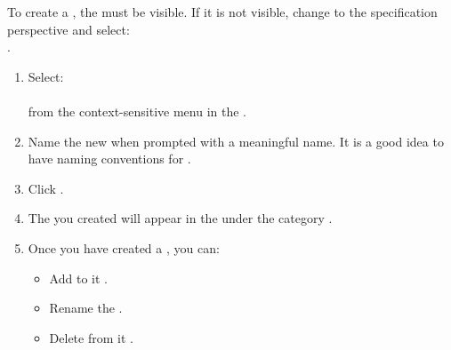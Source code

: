 To create a \gdjob{}, the \gdtestsuitebrowser{} must be visible.
 If it is not visible, change to the specification perspective and select:\\
.

\begin{enumerate}
\item Select:\\
\\
from the context-sensitive menu in the \gdtestsuitebrowser{}. 

\item Name  the new \gdjob{} when prompted with a meaningful name. It is a good idea to have naming conventions for \gdjobs{}. 
\item Click . 
\item The \gdjob{} you created will appear in the \gdtestsuitebrowser{} under the category \bxname{\gdjobs{}}. 
\item Once you have created a \gdjob{}, you can:
\begin{itemize}
\item Add \gdsuites{} to it  .
\item Rename the \gdjob{} .
\item Delete \gdsuites{} from it .
\end{itemize}
\end{enumerate}

